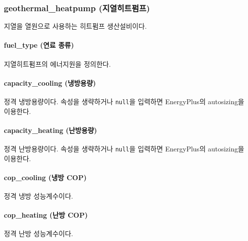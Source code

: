 \subsubsection{geothermal\_heatpump (지열히트펌프)} \label{subsubsection:ioref:geothermalheatpump}

지열을 열원으로 사용하는 히트펌프 생산설비이다.


\paragraph{fuel\_type (연료 종류)} 지열히트펌프의 에너지원을 정의한다.

\paragraph{capacity\_cooling (냉방용량)} 정격 냉방용량이다. 속성을 생략하거나 \texttt{null}을 입력하면 EnergyPlus의 autosizing을 이용한다.

\paragraph{capacity\_heating (난방용량)} 정격 난방용량이다. 속성을 생략하거나 \texttt{null}을 입력하면 EnergyPlus의 autosizing을 이용한다.

\paragraph{cop\_cooling (냉방 COP)} 정격 냉방 성능계수이다. 

\paragraph{cop\_heating (난방 COP)} 정격 난방 성능계수이다.

